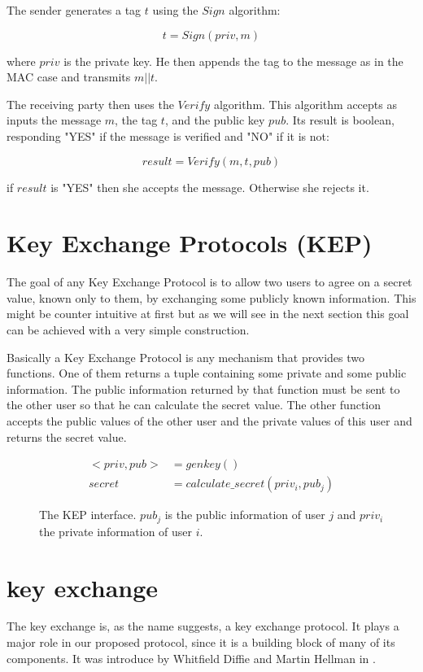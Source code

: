 The sender generates a tag $t$ using the $Sign$ algorithm:

\[
  t = Sign(priv, m)
\]

where $priv$ is the private key.
He then appends the tag to the message as in the MAC case and transmits $m||t$.

The receiving party then uses the $Verify$ algorithm.
This algorithm accepts as inputs the message $m$, the tag $t$, and the public key $pub$.
Its result is boolean, responding "YES" if the message is verified and "NO" if it is not:

\[
  result = Verify(m,t,pub)
\]

if $result$ is "YES" then she accepts the message. Otherwise she rejects it.

\section{Key Exchange Protocols (KEP)}

The goal of any Key Exchange Protocol is to allow two users to agree on a secret value, known only to them, by exchanging some publicly known information.
This might be counter intuitive at first but as we will see in the next section this goal can be achieved with a very simple construction.

Basically a Key Exchange Protocol is any mechanism that provides two functions.
One of them returns a tuple containing some private and some public information.
The public information returned by that function must be sent to the other user so that he can calculate the secret value.
The other function accepts the public values of the other user and the private values of this user and returns the secret value.

\begin{figure}[H]
  \begin{align*}
    <priv, pub> &= genkey() \\
    secret &= calculate\_secret(priv_i, pub_j)
  \end{align*}
  \caption[The interface of a Key Exchange Protocol]{The KEP interface. $pub_j$ is the public information of user $j$ and $priv_i$ the private information of user $i$.}
\end{figure}

\section{\dhname key exchange}

The \dhname key exchange is, as the name suggests, a key exchange protocol.
It plays a major role in our proposed protocol, since it is a building block of many of its components.
It was introduce by Whitfield Diffie and Martin Hellman in \cite{dhpaper}.

